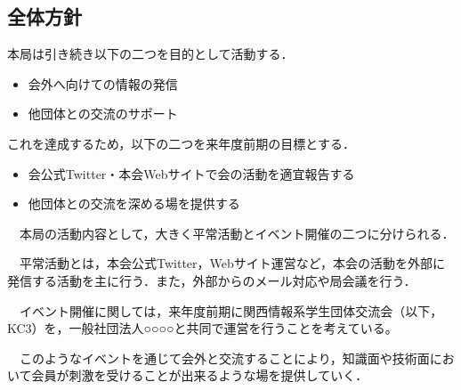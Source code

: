 \subsection*{全体方針}


本局は引き続き以下の二つを目的として活動する．
\begin{itemize}
    \item 会外へ向けての情報の発信
    \item 他団体との交流のサポート
\end{itemize}
これを達成するため，以下の二つを来年度前期の目標とする．
\begin{itemize}
    \item 会公式Twitter・本会Webサイトで会の活動を適宜報告する
    \item 他団体との交流を深める場を提供する
\end{itemize}
　本局の活動内容として，大きく平常活動とイベント開催の二つに分けられる．

　平常活動とは，本会公式Twitter，Webサイト運営など，本会の活動を外部に発信する活動を主に行う．また，外部からのメール対応や局会議を行う．

　イベント開催に関しては，来年度前期に関西情報系学生団体交流会（以下，KC3）を，一般社団法人○○○○と共同で運営を行うことを考えている。

　このようなイベントを通じて会外と交流することにより，知識面や技術面において会員が刺激を受けることが出来るような場を提供していく．

